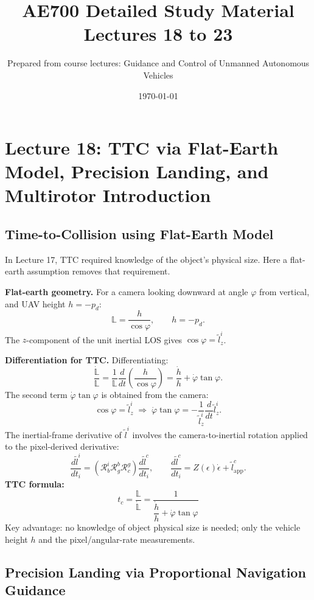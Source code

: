 \documentclass[11pt,a4paper]{article}
\title{AE700 Detailed Study Material\\Lectures 18 to 23}
\author{Prepared from course lectures: Guidance and Control of Unmanned Autonomous Vehicles}
\date{\today}
\begin{document}
\maketitle
\tableofcontents
\newpage

\section{Lecture 18: TTC via Flat-Earth Model, Precision Landing, and Multirotor Introduction}

\subsection{Time-to-Collision using Flat-Earth Model}

In Lecture 17, TTC required knowledge of the object's physical size.
Here a flat-earth assumption removes that requirement.

\textbf{Flat-earth geometry.}
For a camera looking downward at angle $\varphi$ from vertical, and UAV height $h=-p_d$:
\[
\mathbb{L} = \frac{h}{\cos\varphi}, \qquad h=-p_d.
\]
The $z$-component of the unit inertial LOS gives $\cos\varphi = \tilde{l}_z^i$.

\textbf{Differentiation for TTC.}
Differentiating:
\[
\frac{\dot{\mathbb{L}}}{\mathbb{L}}
= \frac{1}{\mathbb{L}}\frac{d}{dt}\!\left(\frac{h}{\cos\varphi}\right)
= \frac{\dot{h}}{h} + \dot{\varphi}\tan\varphi.
\]
The second term $\dot\varphi\tan\varphi$ is obtained from the camera:
\[
\cos\varphi = \tilde{l}_z^i
\;\Rightarrow\;
\dot\varphi\tan\varphi = -\frac{1}{\tilde{l}_z^i}\frac{d}{dt}\tilde{l}_z^i.
\]
The inertial-frame derivative of $\tilde{l}^i$ involves the camera-to-inertial rotation applied to the pixel-derived derivative:
\[
\frac{d\tilde{l}^i}{dt_i} = \left(\mathcal{R}_b^i\mathcal{R}_g^b\mathcal{R}_c^g\right)
\frac{d\tilde{l}^c}{dt_i},
\qquad
\frac{d\tilde{l}^c}{dt_i} = Z(\epsilon)\dot\epsilon + \tilde{l}^c_{\mathrm{app}}.
\]
\textbf{TTC formula:}
\[
\boxed{
t_c = \frac{\mathbb{L}}{\dot{\mathbb{L}}} = \frac{1}{\dfrac{\dot h}{h} + \dot\varphi\tan\varphi}
}
\]
Key advantage: no knowledge of object physical size is needed; only the vehicle height $h$ and the pixel/angular-rate measurements.

\subsection{Precision Landing via Proportional Navigation Guidance}
\end{document}
